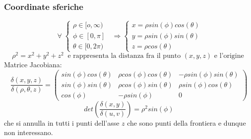 \subsubsection*{Coordinate sferiche}
\[
    \;\forall\; \begin{cases}
        \rho \in [o,\infty)\\
        \phi \in [0,\pi]\\
        \theta \in [0,2\pi)
    \end{cases} \;\; \Longrightarrow \begin{cases}
        x = \rho sin(\phi) cos(\theta)\\
        y = \rho sin(\phi) sin(\theta)\\
        z = \rho cos(\theta)
    \end{cases}
\]
\[
    \rho^2 = x^2 +y^2+z^2 \;\; \text{e rappresenta la distanza fra il punto $(x,y,z)$ e l'origine}\;
\]
Matrice Jacobiana:
\[
    \frac{\delta(x,y,z)}{\delta(\rho,\theta,z)} = \left(
        \begin{matrix}
            sin(\phi) cos(\theta) & \rho cos(\phi) cos(\theta) & -\rho sin(\phi) sin(\theta)\\ 
            sin(\phi) sin(\theta) & \rho cos(\phi) sin(\theta) & \rho sin(\phi) cos(\theta) \\ 
            cos(\phi) & -\rho sin(\phi) & 0
        \end{matrix}\right)
\]
\[
    det(\frac{\delta(x,y)}{\delta(u,v)}) = \rho^2 sin(\phi)
\]
che si annulla in tutti i punti dell'asse $z$ che sono punti della frontiera e dunque non interessano.\newline